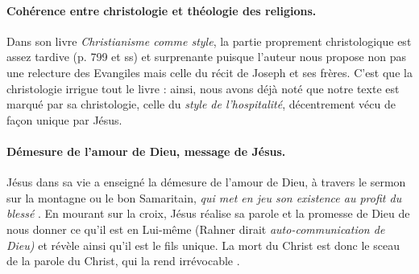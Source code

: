 \paragraph{Cohérence entre christologie et théologie des religions.}
Dans son livre \textit{Christianisme comme style}, la partie proprement christologique est assez tardive (p. 799 et ss) et surprenante puisque l'auteur nous propose non pas une relecture des Evangiles mais celle du récit de Joseph et ses frères. C'est que la christologie irrigue tout le livre : ainsi, nous avons déjà noté que notre texte est marqué par sa christologie, celle du \textit{style de l'hospitalité}, décentrement vécu de façon unique par Jésus.  

\paragraph{Démesure de l'amour de Dieu, message de Jésus.} Jésus dans sa vie a enseigné la démesure de l'amour de Dieu, à travers le sermon sur la montagne ou le bon Samaritain, \textit{qui met en jeu son existence au profit du blessé} .
En mourant sur la croix, Jésus réalise sa parole et la promesse de Dieu de nous donner ce qu'il est en Lui-même (Rahner dirait \textit{auto-communication de Dieu)} et révèle ainsi qu'il est le fils unique. La mort du Christ est donc le sceau de la parole du Christ, qui la rend irrévocable \cite[p.829]{theobald_christianisme_2007}.

\begin{comment}
    Theobald développe cette thèse à l’aide de références scripturaires habilement agencées avant de souligner l’aporie philosophique de l’hospitalité chez Derrida : « la loi inconditionnelle de l’hospitalité illimitée » d’un côté et « les lois de l’hospitalité avec ses droits et ses devoirs toujours conditionnés et conditionnels » de l’autre. Pour Theobald, le corollaire christologique d’une telle aporie est le suivant : « … l’unique sainteté hospitalière de Jésus qui porte tout le dogme chrétien est une manière de se situer au cœur de cette aporie » (p. 162).
\end{comment}



